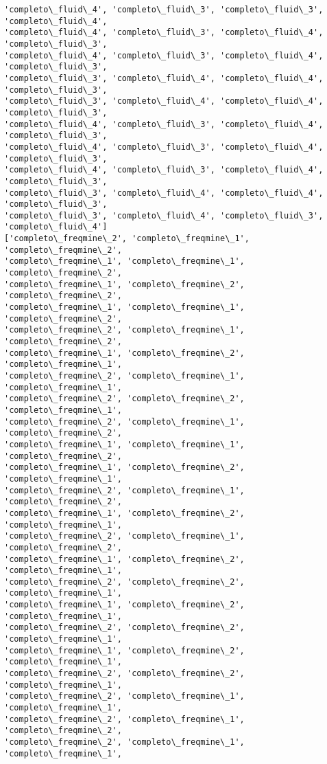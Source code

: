 \documentclass[11pt]{article}
\begin{document}
\begin{Verbatim}[commandchars=\\\{\}]
'completo\_fluid\_4', 'completo\_fluid\_3', 'completo\_fluid\_3', 'completo\_fluid\_4',
'completo\_fluid\_4', 'completo\_fluid\_3', 'completo\_fluid\_4', 'completo\_fluid\_3',
'completo\_fluid\_4', 'completo\_fluid\_3', 'completo\_fluid\_4', 'completo\_fluid\_3',
'completo\_fluid\_3', 'completo\_fluid\_4', 'completo\_fluid\_4', 'completo\_fluid\_3',
'completo\_fluid\_3', 'completo\_fluid\_4', 'completo\_fluid\_4', 'completo\_fluid\_3',
'completo\_fluid\_4', 'completo\_fluid\_3', 'completo\_fluid\_4', 'completo\_fluid\_3',
'completo\_fluid\_4', 'completo\_fluid\_3', 'completo\_fluid\_4', 'completo\_fluid\_3',
'completo\_fluid\_4', 'completo\_fluid\_3', 'completo\_fluid\_4', 'completo\_fluid\_3',
'completo\_fluid\_3', 'completo\_fluid\_4', 'completo\_fluid\_4', 'completo\_fluid\_3',
'completo\_fluid\_3', 'completo\_fluid\_4', 'completo\_fluid\_3', 'completo\_fluid\_4']
['completo\_freqmine\_2', 'completo\_freqmine\_1', 'completo\_freqmine\_2',
'completo\_freqmine\_1', 'completo\_freqmine\_1', 'completo\_freqmine\_2',
'completo\_freqmine\_1', 'completo\_freqmine\_2', 'completo\_freqmine\_2',
'completo\_freqmine\_1', 'completo\_freqmine\_1', 'completo\_freqmine\_2',
'completo\_freqmine\_2', 'completo\_freqmine\_1', 'completo\_freqmine\_2',
'completo\_freqmine\_1', 'completo\_freqmine\_2', 'completo\_freqmine\_1',
'completo\_freqmine\_2', 'completo\_freqmine\_1', 'completo\_freqmine\_1',
'completo\_freqmine\_2', 'completo\_freqmine\_2', 'completo\_freqmine\_1',
'completo\_freqmine\_2', 'completo\_freqmine\_1', 'completo\_freqmine\_2',
'completo\_freqmine\_1', 'completo\_freqmine\_1', 'completo\_freqmine\_2',
'completo\_freqmine\_1', 'completo\_freqmine\_2', 'completo\_freqmine\_1',
'completo\_freqmine\_2', 'completo\_freqmine\_1', 'completo\_freqmine\_2',
'completo\_freqmine\_1', 'completo\_freqmine\_2', 'completo\_freqmine\_1',
'completo\_freqmine\_2', 'completo\_freqmine\_1', 'completo\_freqmine\_2',
'completo\_freqmine\_1', 'completo\_freqmine\_2', 'completo\_freqmine\_1',
'completo\_freqmine\_2', 'completo\_freqmine\_2', 'completo\_freqmine\_1',
'completo\_freqmine\_1', 'completo\_freqmine\_2', 'completo\_freqmine\_1',
'completo\_freqmine\_2', 'completo\_freqmine\_2', 'completo\_freqmine\_1',
'completo\_freqmine\_1', 'completo\_freqmine\_2', 'completo\_freqmine\_1',
'completo\_freqmine\_2', 'completo\_freqmine\_2', 'completo\_freqmine\_1',
'completo\_freqmine\_2', 'completo\_freqmine\_1', 'completo\_freqmine\_1',
'completo\_freqmine\_2', 'completo\_freqmine\_1', 'completo\_freqmine\_2',
'completo\_freqmine\_2', 'completo\_freqmine\_1', 'completo\_freqmine\_1',

\end{Verbatim}
\end{document}
